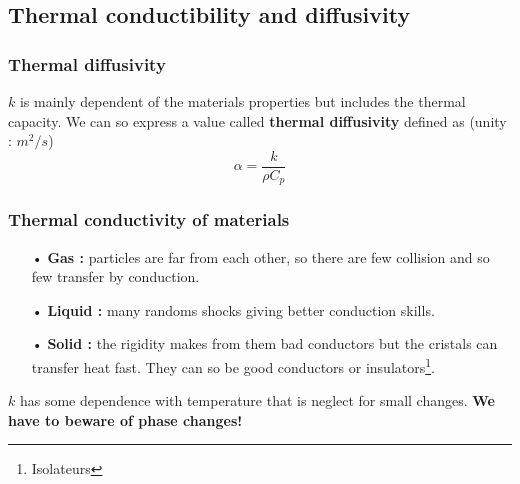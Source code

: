  		\subsection{Thermal conductibility and diffusivity}
			\subsubsection{Thermal diffusivity} 	
	 			$k$ is mainly dependent of the materials properties but includes the thermal capacity. We can so express a value called \textbf{thermal diffusivity} defined as (unity : $m^2/s$)
 				\begin{equation}
 					\alpha = \frac{k}{\rho C_p}
 				\end{equation}
 			
	 		\subsubsection{Thermal conductivity of materials}
	 			\begin{itemize}
	 				\item[•] \textbf{Gas :} particles are far from each other, so there are few collision and so few transfer by conduction. 
	 				\item[•] \textbf{Liquid :} many randoms shocks giving better conduction skills. 
	 				\item[•] \textbf{Solid :} the rigidity makes from them bad conductors but the cristals can transfer heat fast. They can so be good conductors or insulators\footnote{Isolateurs}. \\
	 			\end{itemize}
	 			
	 			$k$ has some dependence with temperature that is neglect for small changes. \textbf{We have to beware of phase changes!}
	 			
